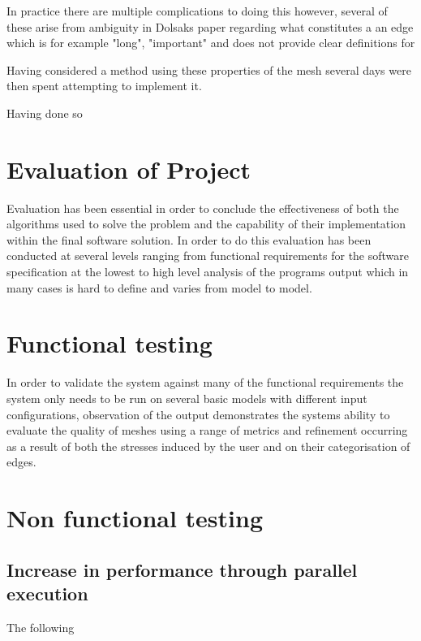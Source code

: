 \documentclass{article}
\begin{document}
\noindent
In practice there are multiple complications to doing this however, several of these arise from ambiguity in Dolsaks paper regarding what constitutes a an edge which is for example "long", "important" and  does not provide clear definitions for 


Having considered a method using these properties of the mesh several days were then spent attempting to implement it.

Having done so 



\subsubsection{}


\section{Evaluation of Project}
Evaluation has been essential in order to conclude the effectiveness of both the algorithms used to solve the problem and the capability of their implementation within the final software solution. In order to do this evaluation has been conducted at several levels ranging from functional requirements for the software specification at the lowest to high level analysis of the programs output which in many cases is hard to define and varies from model to model.

\section{Functional testing}
In order to validate the system against many of the functional requirements the system only needs to be run on several basic models with different input configurations, observation of the output demonstrates the systems ability to evaluate the quality of meshes using a range of metrics and refinement occurring as a result of both the stresses induced by the user and on their categorisation of edges. 

\section{Non functional testing}



\subsection{Increase in performance through parallel execution}
The following 
\end{document}
